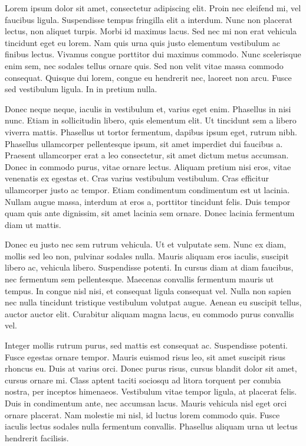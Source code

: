 \documentclass[a4paper,11pt]{article}
\begin{document}


Lorem ipsum dolor sit amet, consectetur adipiscing elit. Proin nec eleifend mi, vel faucibus ligula. Suspendisse tempus fringilla elit a interdum. Nunc non placerat lectus, non aliquet turpis. Morbi id maximus lacus. Sed nec mi non erat vehicula tincidunt eget eu lorem. Nam quis urna quis justo elementum vestibulum ac finibus lectus. Vivamus congue porttitor dui maximus commodo. Nunc scelerisque enim sem, nec sodales tellus ornare quis. Sed non velit vitae massa commodo consequat. Quisque dui lorem, congue eu hendrerit nec, laoreet non arcu. Fusce sed vestibulum ligula. In in pretium nulla.

Donec neque neque, iaculis in vestibulum et, varius eget enim. Phasellus in nisi nunc. Etiam in sollicitudin libero, quis elementum elit. Ut tincidunt sem a libero viverra mattis. Phasellus ut tortor fermentum, dapibus ipsum eget, rutrum nibh. Phasellus ullamcorper pellentesque ipsum, sit amet imperdiet dui faucibus a. Praesent ullamcorper erat a leo consectetur, sit amet dictum metus accumsan. Donec in commodo purus, vitae ornare lectus. Aliquam pretium nisi eros, vitae venenatis ex egestas et. Cras varius vestibulum vestibulum. Cras efficitur ullamcorper justo ac tempor. Etiam condimentum condimentum est ut lacinia. Nullam augue massa, interdum at eros a, porttitor tincidunt felis. Duis tempor quam quis ante dignissim, sit amet lacinia sem ornare. Donec lacinia fermentum diam ut mattis.

Donec eu justo nec sem rutrum vehicula. Ut et vulputate sem. Nunc ex diam, mollis sed leo non, pulvinar sodales nulla. Mauris aliquam eros iaculis, suscipit libero ac, vehicula libero. Suspendisse potenti. In cursus diam at diam faucibus, nec fermentum sem pellentesque. Maecenas convallis fermentum mauris ut tempus. In congue nisl nisi, et consequat ligula consequat vel. Nulla non sapien nec nulla tincidunt tristique vestibulum volutpat augue. Aenean eu suscipit tellus, auctor auctor elit. Curabitur aliquam magna lacus, eu commodo purus convallis vel.

Integer mollis rutrum purus, sed mattis est consequat ac. Suspendisse potenti. Fusce egestas ornare tempor. Mauris euismod risus leo, sit amet suscipit risus rhoncus eu. Duis at varius orci. Donec purus risus, cursus blandit dolor sit amet, cursus ornare mi. Class aptent taciti sociosqu ad litora torquent per conubia nostra, per inceptos himenaeos. Vestibulum vitae tempor ligula, at placerat felis. Duis in condimentum ante, nec accumsan lacus. Mauris vehicula nisl eget orci ornare placerat. Nam molestie mi nisl, id luctus lorem commodo quis. Fusce iaculis lectus sodales nulla fermentum convallis. Phasellus aliquam urna ut lectus hendrerit facilisis.
\end{document}
